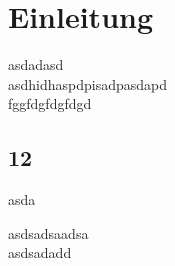 \chapter{Einleitung}
asdadasd~\cite{TS18h7}\\


asdhidhaspdpisadpasdapd~\cite{TS181}\\


fggfdgfdgfdgd~\cite{Chessence14003}\\
\section{12}
asda

asdsadsaadsa~\cite{Chessence17003}\\


asdsadadd~\cite{Laeuferopfer}